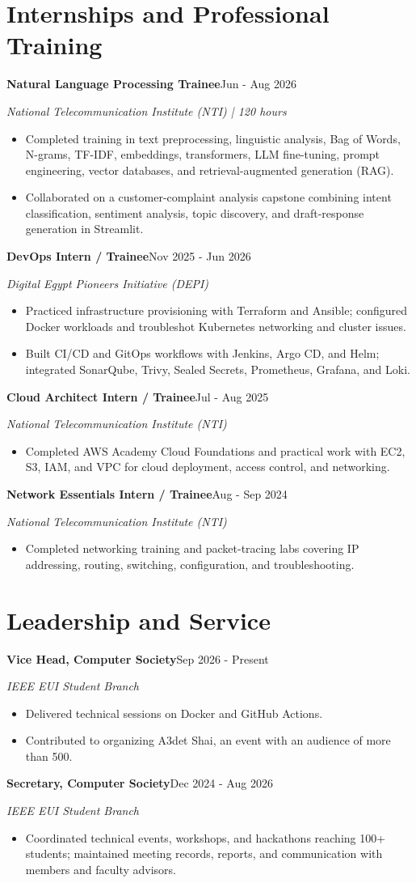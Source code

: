 \documentclass[10pt,a4paper]{article}
\newcommand{\cvitem}[3]{\par\addvspace{4pt}\textbf{#1}\hfill{\small #3}\par{\small\textit{#2}}\par}
\begin{document}
\section*{Internships and Professional Training}
\cvitem{Natural Language Processing Trainee}{National Telecommunication Institute (NTI) | 120 hours}{Jun - Aug 2026}
\begin{itemize}
\item Completed training in text preprocessing, linguistic analysis, Bag of Words, N-grams, TF-IDF, embeddings, transformers, LLM fine-tuning, prompt engineering, vector databases, and retrieval-augmented generation (RAG).
\item Collaborated on a customer-complaint analysis capstone combining intent classification, sentiment analysis, topic discovery, and draft-response generation in Streamlit.
\end{itemize}
\cvitem{DevOps Intern / Trainee}{Digital Egypt Pioneers Initiative (DEPI)}{Nov 2025 - Jun 2026}
\begin{itemize}
\item Practiced infrastructure provisioning with Terraform and Ansible; configured Docker workloads and troubleshot Kubernetes networking and cluster issues.
\item Built CI/CD and GitOps workflows with Jenkins, Argo CD, and Helm; integrated SonarQube, Trivy, Sealed Secrets, Prometheus, Grafana, and Loki.
\end{itemize}
\cvitem{Cloud Architect Intern / Trainee}{National Telecommunication Institute (NTI)}{Jul - Aug 2025}
\begin{itemize}
\item Completed AWS Academy Cloud Foundations and practical work with EC2, S3, IAM, and VPC for cloud deployment, access control, and networking.
\end{itemize}
\cvitem{Network Essentials Intern / Trainee}{National Telecommunication Institute (NTI)}{Aug - Sep 2024}
\begin{itemize}
\item Completed networking training and packet-tracing labs covering IP addressing, routing, switching, configuration, and troubleshooting.
\end{itemize}
\section*{Leadership and Service}
\cvitem{Vice Head, Computer Society}{IEEE EUI Student Branch}{Sep 2026 - Present}
\begin{itemize}
\item Delivered technical sessions on Docker and GitHub Actions.
\item Contributed to organizing A3det Shai, an event with an audience of more than 500.
\end{itemize}
\cvitem{Secretary, Computer Society}{IEEE EUI Student Branch}{Dec 2024 - Aug 2026}
\begin{itemize}
\item Coordinated technical events, workshops, and hackathons reaching 100+ students; maintained meeting records, reports, and communication with members and faculty advisors.
\end{itemize}
\end{document}
